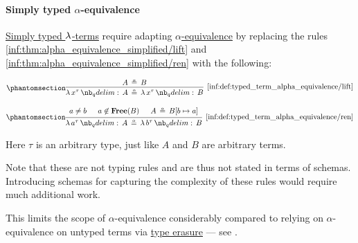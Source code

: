 \paragraph{Simply typed \( \alpha \)-equivalence}

\begin{definition}\label{def:typed_term_alpha_equivalence}
  \hyperref[def:typed_lambda_term]{Simply typed \( \mathrm{\lambda} \)-terms} require adapting \hyperref[def:lambda_term_alpha_equivalence]{\( \alpha \)-equivalence} by replacing the rules \ref{inf:thm:alpha_equivalence_simplified/lift} and \ref{inf:thm:alpha_equivalence_simplified/ren} with the following:
  \begin{paracol}{2}
    \begin{leftcolumn}
      \ParacolAlignmentHack
      \begin{equation*}\taglabel[\ensuremath{ \logic{Lift}_\alpha^{\T{tt}} }]{inf:def:typed_term_alpha_equivalence/lift}
        \begin{prooftree}
          \hypo{ A \aequiv B }
          \infer1[\ref{inf:def:typed_term_alpha_equivalence/lift}]{ \qabs {x^\tau} A \aequiv \qabs {x^\tau} B }
        \end{prooftree}
      \end{equation*}
    \end{leftcolumn}

    \begin{rightcolumn}
      \ParacolAlignmentHack
      \begin{equation*}\taglabel[\ensuremath{ \logic{Ren}_\alpha^{\T{tt}} }]{inf:def:typed_term_alpha_equivalence/ren}
        \begin{prooftree}
          \hypo{ a \neq b }
          \hypo{ a \not\in \op*{Free}(B) }
          \hypo{ A \aequiv B[b \mapsto a] }
          \infer3[\ref{inf:def:typed_term_alpha_equivalence/ren}]{ \qabs {a^\tau} A \aequiv \qabs {b^\tau} B }
        \end{prooftree}
      \end{equation*}
    \end{rightcolumn}
  \end{paracol}
\end{definition}
\begin{comments}
  \item Here \( \tau \) is an arbitrary type, just like \( A \) and \( B \) are arbitrary terms.

  \item Note that these are not typing rules and are thus not stated in terms of schemas. Introducing schemas for capturing the complexity of these rules would require much additional work.

  \item This limits the scope of \( \alpha \)-equivalence considerably compared to relying on \( \alpha \)-equivalence on untyped terms via \hyperref[alg:type_erasure]{type erasure} --- see .
\end{comments}

